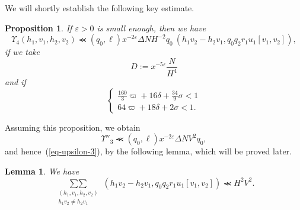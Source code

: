 \documentclass[12pt,a4paper,reqno]{amsart}
\numberwithin{equation}{section}
\theoremstyle{plain}
\newtheorem{proposition}[theorem]{Proposition}
\newtheorem{lemma}[theorem]{Lemma}
\theoremstyle{definition}
\newcommand\eps{\varepsilon}
\def\stacksum#1#2{{\stackrel{{\scriptstyle #1}}
{{\scriptstyle #2}}}}
\newcommand\sumsum{\mathop{\sum\sum}\limits}
\renewcommand{\sim}{\asymp}
\renewcommand{\lessapprox}{\llcurly}
\begin{document}
We will shortly establish the following key estimate.

\begin{proposition}\label{pr-upsilon-4}
  If $\eps>0$ is small enough,
  then we have
$$
\Upsilon_4(h_1,v_1,h_2,v_2)\lessapprox (q_0,\ell)x^{-2\eps}\Delta
NH^{-2}q_0 \ \left(h_1v_2-h_2v_1,q_0q_2r_1u_1[v_1,v_2]\right),
$$
if we take
\begin{equation}\label{eq-def-d}
  D:=x^{-5\eps}\frac{N}{H^4}
\end{equation}
and if
\begin{equation}\label{eq-condition}
\begin{cases}
\tfrac{160}{3}\varpi+16\delta+\tfrac{34}{9}\sigma<1\\
64\varpi+18\delta+2\sigma<1.
\end{cases}
\end{equation}
\end{proposition}

Assuming this proposition, we obtain 
$$
\Upsilon''_3\lessapprox (q_0,\ell)x^{-2\eps}\Delta NV^2q_0,
$$
and hence~(\ref{eq-upsilon-3}), by the following lemma, which will be
proved later.


\begin{lemma}\label{lm-gcd} We have
$$
\sumsum_{\substack{(h_1,v_1,h_2,v_2)\\
    h_1v_2\neq h_2v_1}} 
\left(h_1v_2-h_2v_1,q_0q_2r_1u_1[v_1,v_2]\right)
\lessapprox H^2V^2.
$$
\end{lemma}

\end{document}
